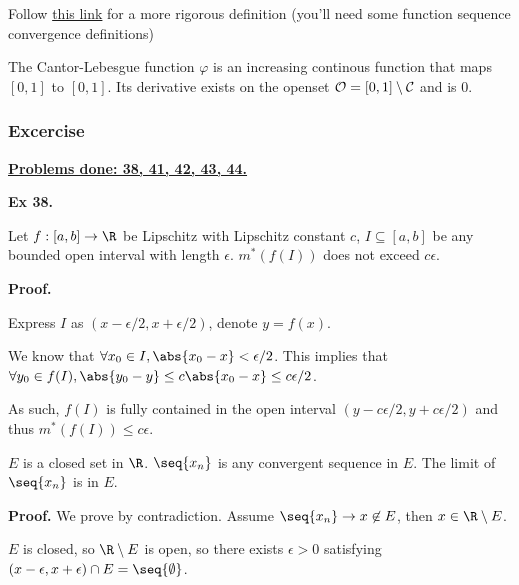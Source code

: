 \begin{defn}
    Follow \href{https://www.math.purdue.edu/~torresm/lecture-notes/lebesgue-theory/lebesgue-lecture16.pdf}{this link} 
    for a more rigorous definition (you'll need some function sequence convergence definitions)
\end{defn}

\begin{prop}
    The Cantor-Lebesgue function $\varphi$ is an increasing continous function that maps $[0,1]$ to $[0,1]$.
    Its derivative exists on the openset $\mathcal{O} = [0,1]\setminus \mathcal{C}$ and is 0.
\end{prop}

\subsubsection{Excercise}
\underline{\textbf{Problems done: 38, 41, 42, 43, 44.}}
\bigskip



\noindent {} \textbf{Ex 38.} \label{ex:2_38}
\begin{lem}
    Let $f: [a,b]\to \R$ be Lipschitz with Lipschitz constant $c$, $I \subseteq [a,b]$ be any bounded open interval with length $\epsilon$.
    $m^\ast(f(I))$ does not exceed $c\epsilon$.
\end{lem}
\textbf{Proof.}

Express $I$ as $(x-\epsilon/2, x+\epsilon/2)$, denote $y = f(x)$.

We know that $\forall x_0 \in I, \abs{x_0 - x} < \epsilon/2$.
This implies that $\forall y_0 \in f(I), \abs{y_0 - y} \leq c\abs{x_0 - x} \leq c\epsilon/2$.

As such, $f(I)$ is fully contained in the open interval $(y-c\epsilon/2, y+c\epsilon/2)$ and thus $m^\ast(f(I)) \leq c\epsilon$.


\begin{lem}
    $E$ is a closed set in $\R$. $\seq{x_n}$ is any convergent sequence in $E$.
    The limit of $\seq{x_n}$ is in $E$.
\end{lem}
\textbf{Proof.} We prove by contradiction. Assume $\seq{x_n} \to x \not\in E$, then $x \in \R\setminus E$. 

$E$ is closed, so $\R\setminus E$ is open, so there exists $\epsilon > 0$ satisfying $(x-\epsilon, x+\epsilon) \intersect E = \seq{\emptyset}$.

